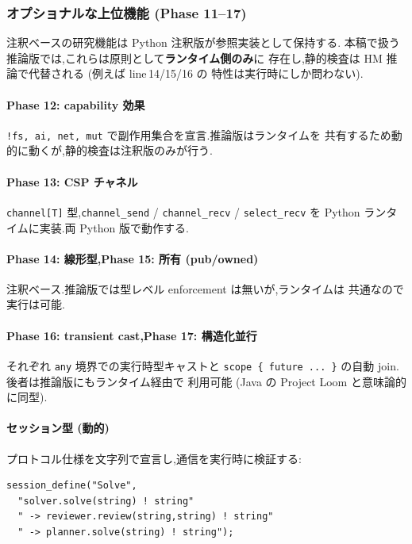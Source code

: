 \documentclass[11pt,a4paper]{article}
\newcommand{\code}[1]{\texttt{\small #1}}
\begin{document}
\subsubsection{オプショナルな上位機能 (Phase 11--17)}

注釈ベースの研究機能は Python 注釈版が参照実装として保持する.
本稿で扱う推論版では,これらは原則として\textbf{ランタイム側のみ}に
存在し,静的検査は HM 推論で代替される (例えば line\,14/15/16 の
特性は実行時にしか問わない).

\paragraph{Phase 12: capability 効果}
\code{!{fs,~ai,~net,~mut}} で副作用集合を宣言.推論版はランタイムを
共有するため動的に動くが,静的検査は注釈版のみが行う.

\paragraph{Phase 13: CSP チャネル}
\code{channel[T]} 型,\code{channel\_send} / \code{channel\_recv} /
\code{select\_recv} を Python ランタイムに実装.両 Python 版で動作する.

\paragraph{Phase 14: 線形型,Phase 15: 所有 (pub/owned)}
注釈ベース.推論版では型レベル enforcement は無いが,ランタイムは
共通なので実行は可能.

\paragraph{Phase 16: transient cast,Phase 17: 構造化並行}
それぞれ \code{any} 境界での実行時型キャストと \code{scope \{
future ... \}} の自動 join.後者は推論版にもランタイム経由で
利用可能 (Java の Project Loom \cite{loom2023} と意味論的に同型).

\paragraph{セッション型 (動的)}
プロトコル仕様を文字列で宣言し,通信を実行時に検証する:

\begin{lstlisting}
session_define("Solve",
  "solver.solve(string) ! string"
  " -> reviewer.review(string,string) ! string"
  " -> planner.solve(string) ! string");
\end{lstlisting}
\end{document}
